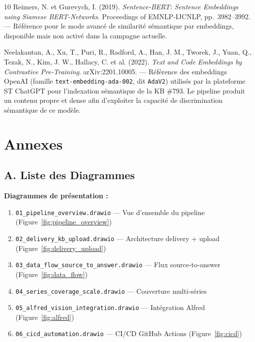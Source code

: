 \documentclass[12pt,a4paper]{report}
\begin{document}
\begin{thebibliography}{10}
Reimers, N. et Gurevych, I. (2019). \textit{Sentence-BERT: Sentence Embeddings using Siamese BERT-Networks}. Proceedings of EMNLP-IJCNLP, pp.~3982--3992. --- Référence pour le mode avancé de similarité sémantique par embeddings, disponible mais non activé dans la campagne actuelle.

Neelakantan, A., Xu, T., Puri, R., Radford, A., Han, J. M., Tworek, J., Yuan, Q., Tezak, N., Kim, J. W., Hallacy, C. et al. (2022). \textit{Text and Code Embeddings by Contrastive Pre-Training}. arXiv:2201.10005. --- Référence des embeddings OpenAI (famille \texttt{text-embedding-ada-002}, dit \texttt{AdaV2}) utilisés par la plateforme ST ChatGPT pour l'indexation sémantique de la KB \#793. Le pipeline produit un contenu propre et dense afin d'exploiter la capacité de discrimination sémantique de ce modèle.

\end{thebibliography}

\chapter*{Annexes}

\section*{A. Liste des Diagrammes}

\textbf{Diagrammes de présentation :}
\begin{enumerate}
  \item \texttt{01\_pipeline\_overview.drawio} --- Vue d'ensemble du pipeline (Figure~\ref{fig:pipeline_overview})
  \item \texttt{02\_delivery\_kb\_upload.drawio} --- Architecture delivery + upload (Figure~\ref{fig:delivery_upload})
  \item \texttt{03\_data\_flow\_source\_to\_answer.drawio} --- Flux source-to-answer (Figure~\ref{fig:data_flow})
  \item \texttt{04\_series\_coverage\_scale.drawio} --- Couverture multi-séries
  \item \texttt{05\_alfred\_vision\_integration.drawio} --- Intégration Alfred (Figure~\ref{fig:alfred})
  \item \texttt{06\_cicd\_automation.drawio} --- CI/CD GitHub Actions (Figure~\ref{fig:cicd})
\end{enumerate}
\end{document}
